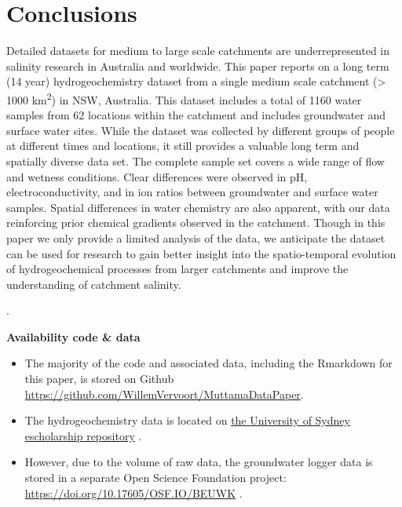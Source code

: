 \documentclass[, manuscript]{copernicus}
\providecommand{\tightlist}{%
  \setlength{\itemsep}{0pt}\setlength{\parskip}{0pt}}
\begin{document}
\section{Conclusions}

Detailed datasets for medium to large scale catchments are
underrepresented in salinity research in Australia and worldwide. This
paper reports on a long term (14 year) hydrogeochemistry dataset from a
single medium scale catchment (\textgreater{} 1000
km\textsuperscript{2}) in NSW, Australia. This dataset includes a total
of 1160 water samples from 62 locations within the catchment and
includes groundwater and surface water sites. While the dataset was
collected by different groups of people at different times and
locations, it still provides a valuable long term and spatially diverse
data set. The complete sample set covers a wide range of flow and
wetness conditions. Clear differences were observed in pH,
electroconductivity, and in ion ratios between groundwater and surface
water samples. Spatial differences in water chemistry are also apparent,
with our data reinforcing prior chemical gradients observed in the
catchment. Though in this paper we only provide a limited analysis of
the data, we anticipate the dataset can be used for research to gain
better insight into the spatio-temporal evolution of hydrogeochemical
processes from larger catchments and improve the understanding of
catchment salinity.

\bigskip

.

\bigskip

\noindent \textbf{Availability code \& data}

\begin{itemize}
\tightlist
\item
  The majority of the code and associated data, including the Rmarkdown
  for this paper, is stored on Github
  \url{https://github.com/WillemVervoort/MuttamaDataPaper}.\\
\item
  The hydrogeochemistry data is located on
  \href{doi.org/10.25910/m0wp-8890}{the University of Sydney
  escholarship repository} \citet{vervoort2025}.\\
\item
  However, due to the volume of raw data, the groundwater logger data is
  stored in a separate Open Science Foundation project:
  \url{https://doi.org/10.17605/OSF.IO/BEUWK} \citet{vervoort2024}.
\end{itemize}
\end{document}
